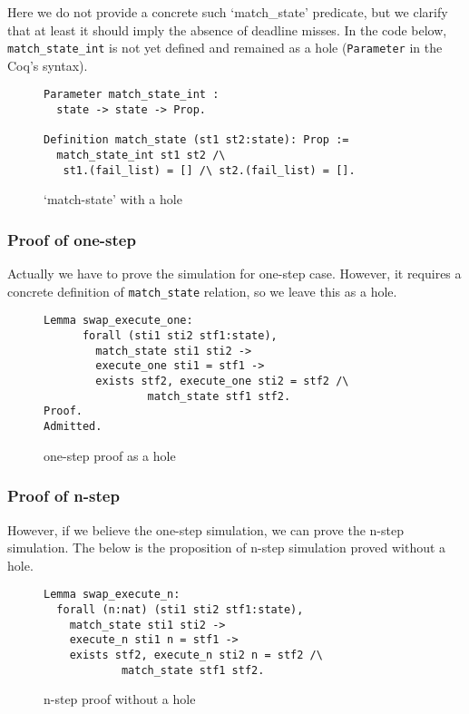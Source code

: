 \documentclass[nocopyrightspace]{sigplanconf}
\begin{document}
Here we do not provide a concrete such `match\_state' predicate, but we clarify that at least it should
imply the absence of deadline misses. In the code below, \texttt{match\_state\_int} is not yet defined and
remained as a hole (\texttt{Parameter} in the Coq's syntax).

\begin{figure}[H]
\begin{verbatim}
Parameter match_state_int :
  state -> state -> Prop.

Definition match_state (st1 st2:state): Prop :=
  match_state_int st1 st2 /\
   st1.(fail_list) = [] /\ st2.(fail_list) = [].
\end{verbatim}
\caption{ `match-state' with a hole }\label{fig:match-state}
\end{figure}

\subsubsection{Proof of one-step}

Actually we have to prove the simulation for one-step case. However, it requires a concrete
definition of \texttt{match\_state} relation, so we leave this as a hole.

\begin{figure}[H]
\begin{verbatim}
Lemma swap_execute_one:
      forall (sti1 sti2 stf1:state),
        match_state sti1 sti2 ->
        execute_one sti1 = stf1 ->
        exists stf2, execute_one sti2 = stf2 /\
                match_state stf1 stf2.
Proof.
Admitted.
\end{verbatim}
\caption{ one-step proof as a hole }\label{fig:one-step-proof}
\end{figure}

\subsubsection{Proof of n-step}

However, if we believe the one-step simulation, we can prove the n-step simulation. The below is
the proposition of n-step simulation proved without a hole.

\begin{figure}[H]
\begin{verbatim}
Lemma swap_execute_n:
  forall (n:nat) (sti1 sti2 stf1:state),
    match_state sti1 sti2 ->
    execute_n sti1 n = stf1 ->
    exists stf2, execute_n sti2 n = stf2 /\
            match_state stf1 stf2.
\end{verbatim}
\caption{ n-step proof without a hole }\label{fig:n-step-proof}
\end{figure}
\end{document}
